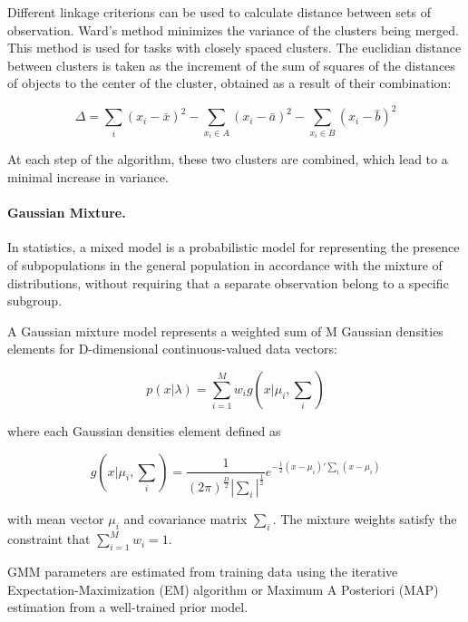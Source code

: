 \documentclass[11pt]{article}
\begin{document}
Different linkage criterions can be used to calculate distance between sets of observation. Ward’s method minimizes the variance of the clusters being merged. This method is used for tasks with closely spaced clusters. The euclidian distance between clusters is taken as the increment of the sum of squares of the distances of objects to the center of the cluster, obtained as a result of their combination: 

\begin{equation}
\Delta = \sum_{i} {(x_{i} - {\bar {x}})^{2}} - \sum_{x_{i} \in A} (x_{i} - {\bar {a}})^{2} - \sum_{x_{i} \in B} (x_{i} - {\bar {b}})^{2}
\end{equation}

At each step of the algorithm, these two clusters are combined, which lead to a minimal increase in variance.



\paragraph{Gaussian Mixture.}

In statistics, a mixed model is a probabilistic model for representing the presence of subpopulations in the general population in accordance with the mixture of distributions, without requiring that a separate observation belong to a specific subgroup.

A Gaussian mixture model \cite{reynolds2015gaussian} represents a weighted sum of M Gaussian densities elements for D-dimensional continuous-valued data vectors:

\begin{equation}
p(x|\lambda) = \sum_{i=1}^{M} w_{i} g(x|\mu_{i}, \sum_{i})
\end{equation}

where each Gaussian densities element defined as 

\begin{equation}
g(x|\mu_{i}, \sum_{i})=\frac{1}{(2\pi)^{\frac{D}{2}}|\sum_{i}|^{\frac{1}{2}}} e^{-\frac{1}{2}(x-\mu_{i})'\sum_{i}(x-\mu_{i})} 
\end{equation}

with mean vector $\mu_{i}$ and covariance matrix $\sum_{i}$. The mixture weights satisfy the constraint that $\sum_{i=1}^{M} w_{i} = 1$.

GMM parameters are estimated from training data using the iterative Expectation-Maximization (EM) algorithm or Maximum A Posteriori (MAP) estimation from a well-trained prior model.
\end{document}

